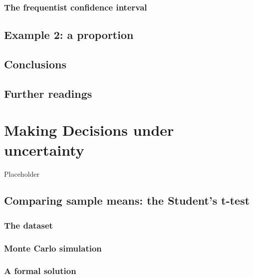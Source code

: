 \documentclass[a4paper,12pt,oneside]{book}
\begin{document}
\hypertarget{the-frequentist-confidence-interval}{%
\subsection{The frequentist confidence interval}\label{the-frequentist-confidence-interval}}

\hypertarget{example-2-a-proportion}{%
\section{Example 2: a proportion}\label{example-2-a-proportion}}

\hypertarget{conclusions-2}{%
\section{Conclusions}\label{conclusions-2}}

\hypertarget{further-readings-3}{%
\section{Further readings}\label{further-readings-3}}

\hypertarget{making-decisions-under-uncertainty}{%
\chapter{Making Decisions under uncertainty}\label{making-decisions-under-uncertainty}}

Placeholder

\hypertarget{comparing-sample-means-the-students-t-test}{%
\section{Comparing sample means: the Student's t-test}\label{comparing-sample-means-the-students-t-test}}

\hypertarget{the-dataset}{%
\subsection{The dataset}\label{the-dataset}}

\hypertarget{monte-carlo-simulation}{%
\subsection{Monte Carlo simulation}\label{monte-carlo-simulation}}

\hypertarget{a-formal-solution}{%
\subsection{A formal solution}\label{a-formal-solution}}
\end{document}
